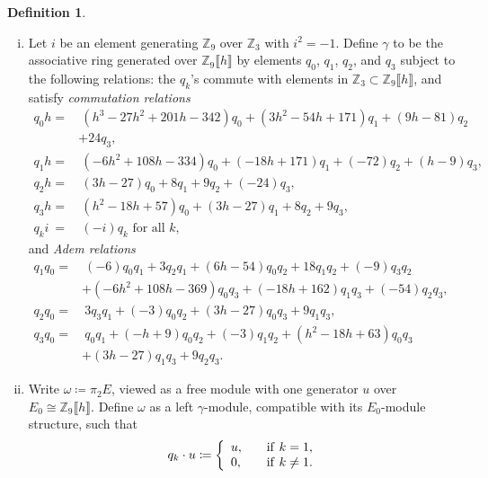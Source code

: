 \documentclass{gtpart}
\theoremstyle{definition}
\newtheorem{defn}[thm]{Definition}
\theoremstyle{remark}
\newcommand{\mb}[1]{\mathbb{#1}}
\newcommand{\BZ}{{\mb Z}}
\newcommand{\g}{\gamma}
\newcommand{\ce}{\coloneqq}
\numberwithin{equation}{section}
\numberwithin{thm}{section}
\begin{document}
\begin{defn}
\label{def:go}
 \mbox{}
 \begin{enumerate}[(i)]
  \item \label{go(i)} Let $i$ be an element generating $\BZ_9$ over 
  $\BZ_3$ with $i^2 = -1$.  Define $\g$ to be the associative ring 
  generated over $\BZ_9 \llbracket h \rrbracket$ by elements $q_0$, 
  $q_1$, $q_2$, and $q_3$ subject to the following relations: the 
  $q_k$'s commute with elements in 
  $\BZ_3 \subset \BZ_9 \llbracket h \rrbracket$, and satisfy 
  {\em commutation relations} 
  \begin{equation*}
  \begin{split}
   q_0 h = & ~ (h^3 - 27 h^2 + 201 h - 342) q_0 + (3 h^2 - 54 h + 171) q_1 + (9 h - 81) q_2 \\
           & + 24 q_3, \\
   q_1 h = & ~ (-6 h^2 + 108 h - 334) q_0 + (-18 h + 171) q_1 + (-72) q_2 + (h - 9) q_3, \\
   q_2 h = & ~ (3 h - 27) q_0 + 8 q_1 + 9 q_2 + (-24) q_3, \\
   q_3 h = & ~ (h^2 - 18 h + 57) q_0 + (3 h - 27) q_1 + 8 q_2 + 9 q_3, \\
   q_k i ~ = & ~ (-i) q_k \text{~for all~} k, 
  \end{split}
  \end{equation*}
  and {\em Adem relations} 
  \begin{equation*}
  \begin{split}
   q_1q_0 = & ~ (-6) q_0q_1 + 3 q_2q_1 + (6 h - 54) q_0q_2 + 18 q_1q_2 + (-9) q_3q_2 \\
            & + (-6 h^2 + 108 h - 369) q_0q_3 + (-18 h + 162) q_1q_3 + (-54) q_2q_3, \quad~~ \\
   q_2q_0 = & ~ 3 q_3q_1 + (-3) q_0q_2 + (3 h - 27) q_0q_3 + 9 q_1q_3, \\
   q_3q_0 = & ~ q_0q_1 + (-h + 9) q_0q_2 + (-3) q_1q_2 + (h^2 - 18 h + 63) q_0q_3 \\
            & + (3 h - 27) q_1q_3 + 9 q_2q_3.  
  \end{split}
  \end{equation*}

  \item \label{go(ii)} Write $\omega \ce \pi_2 E$, viewed as a free 
  module with one generator $u$ over 
  $E_0 \cong \BZ_9 \llbracket h \rrbracket$.  Define $\omega$ as a left 
  $\g$-module, compatible with its $E_0$-module structure, such that 
  \[
   q_k \cdot u \ce \left\{
   \begin{array}{ll}
     u,  & \quad {\rm if}~k = 1, \\
     0,  & \quad {\rm if}~k \neq 1.  
   \end{array}
   \right.
  \]
 \end{enumerate}
\end{defn}
\end{document}

